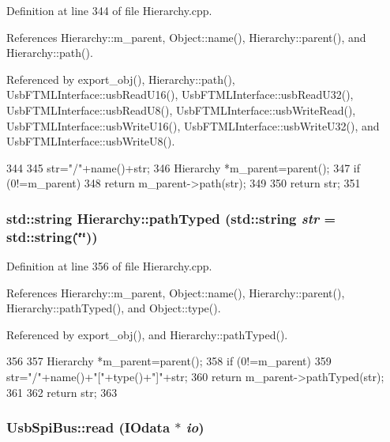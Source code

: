 Definition at line 344 of file Hierarchy.cpp.

References Hierarchy::m\_\-parent, Object::name(), Hierarchy::parent(), and Hierarchy::path().

Referenced by export\_\-obj(), Hierarchy::path(), UsbFTMLInterface::usbReadU16(), UsbFTMLInterface::usbReadU32(), UsbFTMLInterface::usbReadU8(), UsbFTMLInterface::usbWriteRead(), UsbFTMLInterface::usbWriteU16(), UsbFTMLInterface::usbWriteU32(), and UsbFTMLInterface::usbWriteU8().


\begin{DoxyCode}
344                                       {
345   str="/"+name()+str;
346   Hierarchy *m_parent=parent();
347   if (0!=m_parent){
348     return m_parent->path(str);
349   }
350   return str;
351 }
\end{DoxyCode}
\hypertarget{classHierarchy_a1efd56cd164d328d2002e53a10a19b8c}{
\subsubsection[{pathTyped}]{\setlength{\rightskip}{0pt plus 5cm}std::string Hierarchy::pathTyped (std::string {\em str} = {\ttfamily std::string(\char`\"{}\char`\"{})})}}
\label{classHierarchy_a1efd56cd164d328d2002e53a10a19b8c}


Definition at line 356 of file Hierarchy.cpp.

References Hierarchy::m\_\-parent, Object::name(), Hierarchy::parent(), Hierarchy::pathTyped(), and Object::type().

Referenced by export\_\-obj(), and Hierarchy::pathTyped().


\begin{DoxyCode}
356                                            {
357   Hierarchy *m_parent=parent();
358   if (0!=m_parent){
359     str="/"+name()+"["+type()+"]"+str;
360     return m_parent->pathTyped(str);
361   }
362   return str;
363 }
\end{DoxyCode}
\hypertarget{classUsbSpiBus_a6c08e2e9a50e4c540c1eda6d7d2967a5}{
\subsubsection[{read}]{ UsbSpiBus::read ({\bf IOdata} $\ast$ {\em io})}}
\label{classUsbSpiBus_a6c08e2e9a50e4c540c1eda6d7d2967a5}


